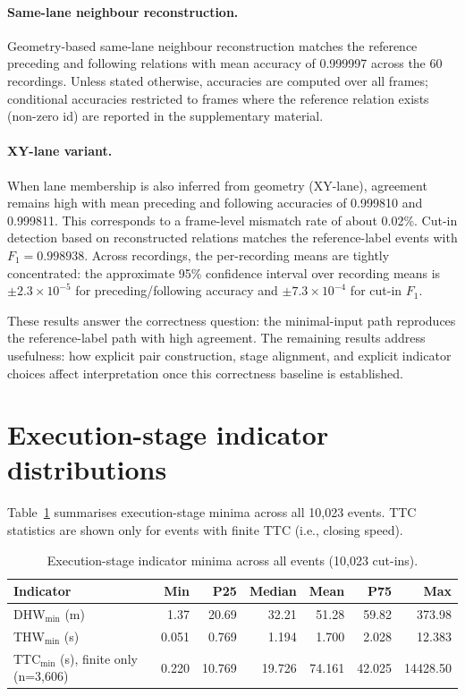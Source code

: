 \documentclass[12pt,a4paper,twoside,openright]{report}
\begin{document}
    \paragraph{Same-lane neighbour reconstruction.}
    Geometry-based same-lane neighbour reconstruction matches the reference preceding and following relations with mean accuracy of 0.999997 across the 60 recordings. Unless stated otherwise, accuracies are computed over all frames; conditional accuracies restricted to frames where the reference relation exists (non-zero id) are reported in the supplementary material.

    \paragraph{XY-lane variant.}
    When lane membership is also inferred from geometry (XY-lane), agreement remains high with mean preceding and following accuracies of 0.999810 and 0.999811. This corresponds to a frame-level mismatch rate of about 0.02\%. Cut-in detection based on reconstructed relations matches the reference-label events with $F_1 = 0.998938$. Across recordings, the per-recording means are tightly concentrated: the approximate 95\% confidence interval over recording means is $\pm 2.3\times10^{-5}$ for preceding/following accuracy and $\pm 7.3\times10^{-4}$ for cut-in $F_1$.

    These results answer the correctness question: the minimal-input path reproduces the reference-label path with high agreement. The remaining results address usefulness: how explicit pair construction, stage alignment, and explicit indicator choices affect interpretation once this correctness baseline is established.

    \section{Execution-stage indicator distributions}
    Table~\ref{tab:exec-dist} summarises execution-stage minima across all 10,023 events. TTC statistics are shown only for events with finite TTC (i.e., closing speed).

    \begin{table}[H]
        \centering
        \caption{Execution-stage indicator minima across all events (10,023 cut-ins).}
        \label{tab:exec-dist}
        {\small
        \setlength{\tabcolsep}{4pt}
            \begin{tabular}{@{}lrrrrrr@{}}
                \toprule
                Indicator & Min & P25 & Median & Mean & P75 & Max \\
                \midrule
                DHW$_{\min}$ (m) & 1.37 & 20.69 & 32.21 & 51.28 & 59.82 & 373.98 \\
                THW$_{\min}$ (s) & 0.051 & 0.769 & 1.194 & 1.700 & 2.028 & 12.383 \\
                TTC$_{\min}$ (s), finite only (n=3,606) & 0.220 & 10.769 & 19.726 & 74.161 & 42.025 & 14428.50 \\
                \bottomrule
            \end{tabular}}
    \end{table}
\end{document}
